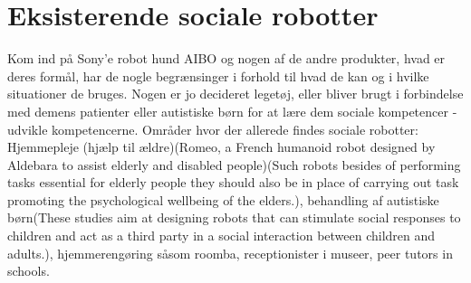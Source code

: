 \section{Eksisterende sociale robotter}
\label{EksisterendeSocialeRobotter}
%
Kom ind på Sony'e robot hund AIBO og nogen af de andre produkter, hvad er deres formål, har de nogle begrænsinger i forhold til hvad de kan og i hvilke situationer de bruges. Nogen er jo decideret legetøj, eller bliver brugt i forbindelse med demens patienter eller autistiske børn for at lære dem sociale kompetencer - udvikle kompetencerne. \blankline
%
Områder hvor der allerede findes sociale robotter: Hjemmepleje (hjælp til ældre)(Romeo, a French humanoid robot designed by Aldebara to assist elderly and disabled people)(Such robots besides of performing tasks essential for elderly people they should also be in place of carrying out task promoting the psychological wellbeing of the elders.), behandling af autistiske børn(These studies aim at designing robots that can stimulate social responses to children and act as a third party in a social interaction between children and adults.), hjemmerengøring såsom roomba, receptionister i museer, peer tutors in schools. 